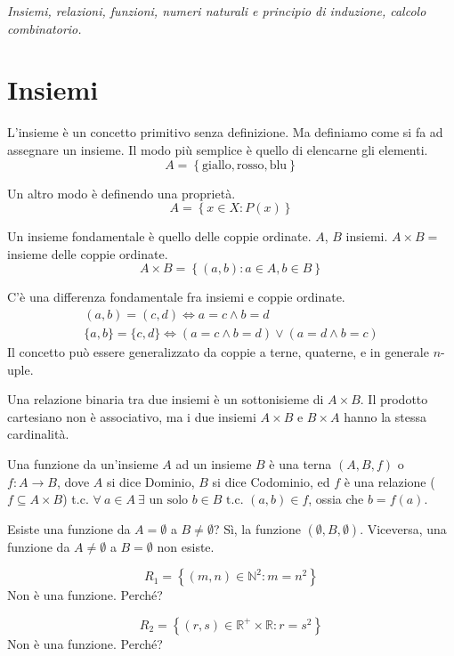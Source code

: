 \begin{center}
\indent
\textit{Insiemi, relazioni, funzioni, numeri naturali e principio di induzione, calcolo combinatorio.}
\end{center}

\section{Insiemi}

L'insieme \`e un concetto primitivo senza definizione. Ma definiamo come si fa ad assegnare un insieme. Il modo pi\`u semplice \`e quello di elencarne gli elementi. 
\[
A = \left\{ \text{giallo}, \text{rosso}, \text{blu} \right\}
\]

Un altro modo \`e definendo una propriet\`a.
\[
A = \left\{ x \in X : P(x) \right\}
\]

Un insieme fondamentale \`e quello delle coppie ordinate. $A$, $B$ insiemi. $A \times B =$ insieme delle coppie ordinate.
\[
A \times B = \left\{ (a,b) : a \in A, b \in B \right\}
\]

C'\`e una differenza fondamentale fra insiemi e coppie ordinate.
\begin{gather*}
(a,b) = (c,d) \Leftrightarrow a = c \land b = d \\
\{a,b\} = \{c,d\} \Leftrightarrow (a = c \land b = d) \lor (a = d \land b = c)
\end{gather*}
Il concetto pu\`o essere generalizzato da coppie a terne, quaterne, e in generale $n$-uple.

Una relazione binaria tra due insiemi \`e un sottonisieme di $A \times B$. Il prodotto cartesiano non \`e associativo, ma i due insiemi $A \times B$ e $B \times A$ hanno la stessa cardinalit\`a.

Una funzione da un'insieme $A$ ad un insieme $B$ \`e una terna $(A, B, f)$ o $f : A \to B$, dove $A$ si dice Dominio, $B$ si dice Codominio, ed $f$ \`e una relazione ($f \subseteq A \times B$) t.c. $\forall \ a \in A \ \exists \text{ un solo } b \in B \text{ t.c. } (a,b) \in f$, ossia che $b = f(a)$.

Esiste una funzione da $A = \emptyset$ a $B \neq \emptyset$? S\`i, la funzione $(\emptyset, B, \emptyset)$. Viceversa, una funzione da $A \neq \emptyset$ a $B = \emptyset$ non esiste.

\[
R_1 = \left\{ (m, n) \in \mathbb{N}^2 : m = n^2 \right\}
\]
Non \`e una funzione. Perch\'e? \vspace{3cm}

\[
R_2 = \left\{ (r, s) \in \mathbb{R}^+ \times \mathbb{R} : r = s^2 \right\}
\]
Non \`e una funzione. Perch\'e?
\vspace{3cm}

